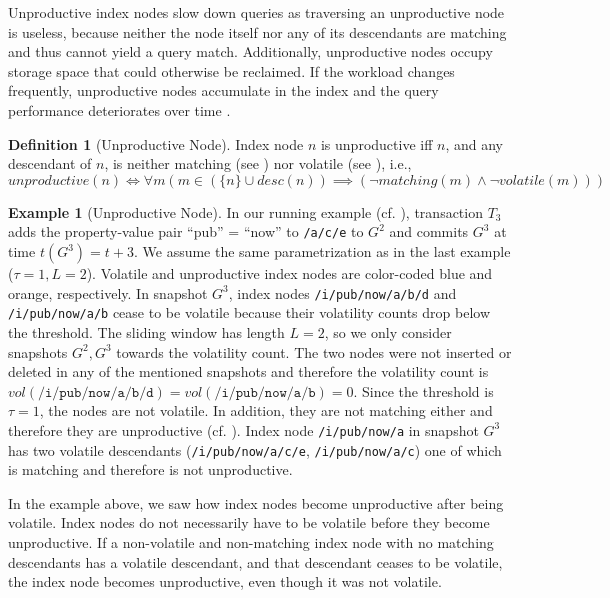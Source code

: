 \documentclass[abstracton,12pt]{scrartcl}
\theoremstyle{definition}
\newtheorem{definition}{Definition}
\newtheorem{example}{Example}
\begin{document}
Unproductive index nodes slow down
queries as traversing an unproductive node is useless, because neither the node
itself nor any of its descendants are matching and thus cannot
yield a query match. Additionally, unproductive nodes occupy storage space that
could otherwise be reclaimed. If the workload changes frequently, unproductive
nodes accumulate in the index and the query performance deteriorates
over time \cite{KW17}.

\begin{definition}[Unproductive Node]
  Index node $n$ is unproductive iff $n$, and any descendant of
  $n$, is neither matching (see ) nor volatile (see
  ), i.e.,
  $$ unproductive(n) \iff \forall  m (m \in (\{n\} \cup desc(n)) \implies
  (\neg matching(m) \land \neg volatile(m))) $$
  \label{def:unproductive-node}
\end{definition}

\vspace{-0.5cm}

\begin{example}[Unproductive Node]
  In our running example (cf. ), transaction $T_3$ adds
  the property-value pair ``pub'' = ``now'' to \texttt{/a/c/e} to $G^2$ and commits $G^3$ at time
  $t(G^3) = t+3$. We assume the same parametrization as in the last example
  ($\tau = 1, L = 2$). Volatile and unproductive index nodes are color-coded
  blue and orange, respectively.
  In snapshot $G^3$, index nodes \texttt{/i/pub/now/a/b/d} and
  \texttt{/i/pub/now/a/b} cease to be volatile because their 
  volatility counts drop below the threshold. The sliding window has length $L =
  2$, so we only consider snapshots $G^2,G^3$ towards the volatility count. The two
  nodes were not inserted or deleted in any of the mentioned snapshots and
  therefore the volatility count is $vol(\texttt{/i/pub/now/a/b/d}) =
  vol(\texttt{/i/pub/now/a/b}) = 0$. Since the threshold is $\tau = 1$, the nodes are
  not volatile. In addition,
  they are not matching either and therefore they are unproductive (cf.
  ). Index node
  \texttt{/i/pub/now/a} in snapshot $G^3$ has
  two volatile descendants (\texttt{/i/pub/now/a/c/e}, \texttt{/i/pub/now/a/c}) 
  one of which is matching and therefore is not unproductive.
  \label{ex:unproductive-node}
\end{example}

In the example above, we saw how index nodes become unproductive after being
volatile. Index nodes do not necessarily have to be volatile before they become
unproductive.
If a non-volatile and non-matching index node with no matching descendants has a
volatile descendant, and that descendant ceases to
be volatile, the index node becomes unproductive, even though it was not
volatile.
\end{document}
